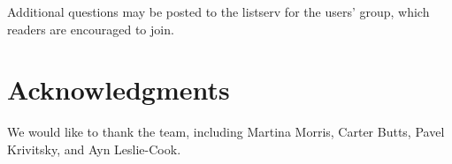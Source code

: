 \documentclass[nojss]{jss}
\begin{document}
Additional questions may be posted to the listserv for the  users' group, which readers are encouraged to join\citep{statnetusersgroup}.

\section*{Acknowledgments}

We would like to thank the  team, including Martina Morris, Carter Butts, Pavel Krivitsky, and Ayn Leslie-Cook.







\end{document}
